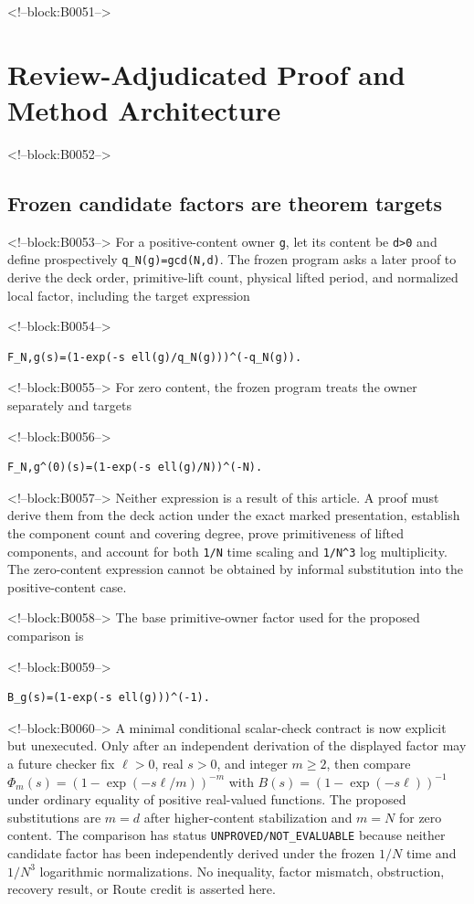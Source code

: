 \documentclass[11pt]{article}
\begin{document}
<!--block:B0051-->
\hypertarget{4-review-adjudicated-proof-and-method-architecture}{%
\section{Review-Adjudicated Proof and Method
Architecture}\label{4-review-adjudicated-proof-and-method-architecture}}

<!--block:B0052-->
\hypertarget{41-frozen-candidate-factors-are-theorem-targets}{%
\subsection{Frozen candidate factors are theorem
targets}\label{41-frozen-candidate-factors-are-theorem-targets}}

<!--block:B0053-->
For a positive-content owner \texttt{g}, let its content be
\texttt{d\textgreater{}0} and define prospectively
\texttt{q\_N(g)=gcd(N,d)}. The frozen program asks a later proof to
derive the deck order, primitive-lift count, physical lifted period, and
normalized local factor, including the target expression

<!--block:B0054-->
\begin{verbatim}
F_N,g(s)=(1-exp(-s ell(g)/q_N(g)))^(-q_N(g)).
\end{verbatim}

<!--block:B0055-->
For zero content, the frozen program treats the owner separately and
targets

<!--block:B0056-->
\begin{verbatim}
F_N,g^(0)(s)=(1-exp(-s ell(g)/N))^(-N).
\end{verbatim}

<!--block:B0057-->
Neither expression is a result of this article. A proof must derive them from
the deck action under the exact marked presentation, establish the
component count and covering degree, prove primitiveness of lifted
components, and account for both \texttt{1/N} time scaling and
\texttt{1/N\^{}3} log multiplicity. The zero-content expression cannot
be obtained by informal substitution into the positive-content case.

<!--block:B0058-->
The base primitive-owner factor used for the proposed comparison is

<!--block:B0059-->
\begin{verbatim}
B_g(s)=(1-exp(-s ell(g)))^(-1).
\end{verbatim}

<!--block:B0060-->
A minimal conditional scalar-check contract is now explicit but unexecuted.
Only after an independent derivation of the displayed factor may a future
checker fix \(\ell>0\), real \(s>0\), and integer \(m\geq 2\), then compare
\(\Phi_m(s)=(1-\exp(-s\ell/m))^{-m}\) with
\(B(s)=(1-\exp(-s\ell))^{-1}\) under ordinary equality of positive
real-valued functions. The proposed substitutions are \(m=d\) after
higher-content stabilization and \(m=N\) for zero content. The comparison
has status \texttt{UNPROVED/NOT\_EVALUABLE} because neither candidate factor
has been independently derived under the frozen \(1/N\) time and
\(1/N^3\) logarithmic normalizations. No inequality, factor mismatch,
obstruction, recovery result, or Route credit is asserted here.
\end{document}
